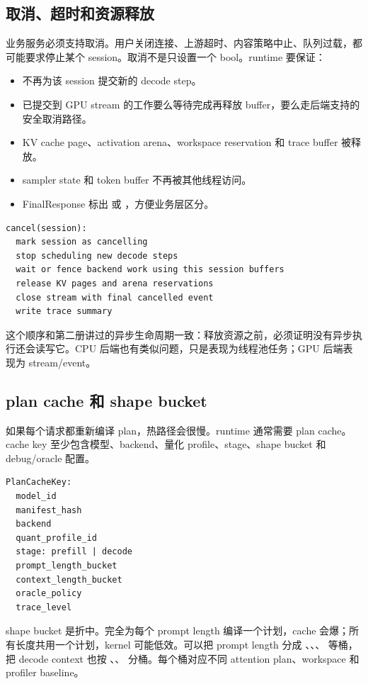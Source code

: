 \subsection{取消、超时和资源释放}

业务服务必须支持取消。用户关闭连接、上游超时、内容策略中止、队列过载，都可能要求停止某个 session。取消不是只设置一个 bool。runtime 要保证：

\begin{itemize}
  \item 不再为该 session 提交新的 decode step。
  \item 已提交到 GPU stream 的工作要么等待完成再释放 buffer，要么走后端支持的安全取消路径。
  \item KV cache page、activation arena、workspace reservation 和 trace buffer 被释放。
  \item sampler state 和 token buffer 不再被其他线程访问。
  \item FinalResponse 标出  或 ，方便业务层区分。
\end{itemize}

\begin{lstlisting}[numbers=none,caption={取消路径的资源顺序}]
cancel(session):
  mark session as cancelling
  stop scheduling new decode steps
  wait or fence backend work using this session buffers
  release KV pages and arena reservations
  close stream with final cancelled event
  write trace summary
\end{lstlisting}

这个顺序和第二册讲过的异步生命周期一致：释放资源之前，必须证明没有异步执行还会读写它。CPU 后端也有类似问题，只是表现为线程池任务；GPU 后端表现为 stream/event。

\subsection{plan cache 和 shape bucket}

如果每个请求都重新编译 plan，热路径会很慢。runtime 通常需要 plan cache。cache key 至少包含模型、backend、量化 profile、stage、shape bucket 和 debug/oracle 配置。

\begin{lstlisting}[numbers=none,caption={PlanCacheKey 字段}]
PlanCacheKey:
  model_id
  manifest_hash
  backend
  quant_profile_id
  stage: prefill | decode
  prompt_length_bucket
  context_length_bucket
  oracle_policy
  trace_level
\end{lstlisting}

shape bucket 是折中。完全为每个 prompt length 编译一个计划，cache 会爆；所有长度共用一个计划，kernel 可能低效。可以把 prompt length 分成 、、、 等桶，把 decode context 也按 、、 分桶。每个桶对应不同 attention plan、workspace 和 profiler baseline。


